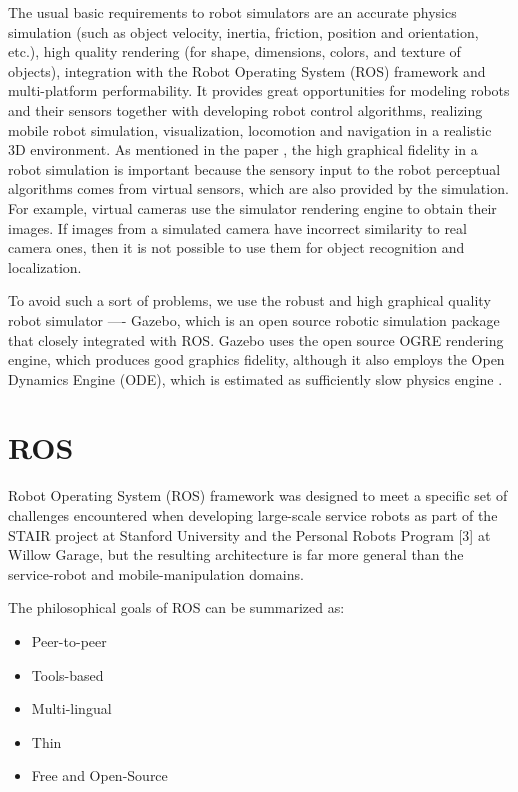 
The usual basic requirements to robot simulators are an accurate physics simulation (such as object velocity, inertia, friction, position and orientation, etc.), high quality rendering (for shape, dimensions, colors, and texture of objects), integration with the Robot Operating System (ROS) framework and multi-platform performability. It provides great opportunities for modeling robots and their sensors together with developing robot control algorithms, realizing mobile robot simulation, visualization, locomotion and navigation in a realistic 3D environment. As mentioned in the paper \cite{jmeSim2012}, the high graphical fidelity in a robot simulation is important because the sensory input to the robot perceptual algorithms comes from virtual sensors, which are also provided by the simulation. For example, virtual cameras use the simulator rendering engine to obtain their images. If images from a simulated camera have incorrect similarity to real camera ones, then it is not possible to use them for object recognition and localization.

To avoid such a sort of problems, we use the robust and high graphical quality robot simulator ---- Gazebo, which is an open source robotic simulation package that closely integrated with ROS. Gazebo uses the open source OGRE rendering engine, which produces good graphics fidelity, although it also employs the Open Dynamics Engine (ODE), which is estimated as sufficiently slow physics engine \cite{jmeSim2012}.

\section{ROS}

Robot Operating System (ROS) framework \cite{ROS2009} was designed to meet a specific set of challenges encountered when developing large-scale service robots as part of the STAIR project \cite{STAIR2007} at Stanford University and the Personal Robots Program [3] at Willow Garage, but the resulting architecture is far more general than the service-robot and mobile-manipulation domains.

The philosophical goals of ROS can be summarized as:

\begin{itemize}
\item Peer-to-peer 
\item Tools-based 
\item Multi-lingual 
\item Thin
\item Free and Open-Source
\end{itemize}

